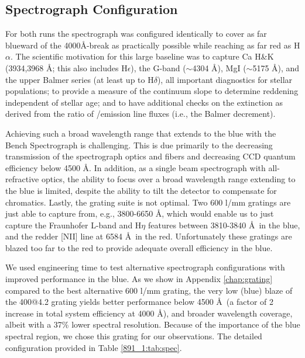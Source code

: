 \subsection{Spectrograph Configuration}

For both runs the spectrograph was configured identically to cover as
far blueward of the 4000\AA-break as practically possible while
reaching as far red as H$\alpha$.  The scientific motivation for this
large baseline was to capture Ca H\&K (3934,3968 \AA; this also
includes H$\epsilon$), the G-band ($\sim$4304 \AA), MgI
($\sim$5175 \AA), and the upper Balmer series (at least up to
H$\delta$), all important diagnostics for stellar populations; to
provide a measure of the continuum slope to determine reddening
independent of stellar age; and to have additional checks on the
extinction as derived from the ratio of \Ha/\HB emission line fluxes
(i.e., the Balmer decrement).

Achieving such a broad wavelength range that extends to the blue with
the Bench Spectrograph is challenging. This is due primarily to the
decreasing transmission of the spectrograph optics and fibers and
decreasing CCD quantum efficiency below 4500 \AA. In addition, as a
single beam spectrograph with all-refractive optics, the ability to
focus over a broad wavelength range extending to the blue is limited,
despite the ability to tilt the detector to compensate for chromatics.
Lastly, the grating suite is not optimal. Two 600 l/mm gratings are
just able to capture from, e.g., 3800-6650 \AA, which would enable us
to just capture the Fraunhofer L-band and H$\eta$ features between
3810-3840 \AA\ in the blue, and the redder [NII] line at 6584 \AA\ in the
red. Unfortunately these gratings are blazed too far to the red to
provide adequate overall efficiency in the blue.

We used engineering time to test alternative spectrograph
configurations with improved performance in the blue.  As we show in
Appendix \ref{chap:grating} compared to the best alternative 600 l/mm
grating, the very low (blue) blaze of the 400@4.2 grating yields
better performance below 4500 \AA\ (a factor of 2 increase in total
system efficiency at 4000 \AA), and broader wavelength coverage, albeit
with a 37\% lower spectral resolution. Because of the importance of
the blue spectral region, we chose this grating for our
observations. The detailed configuration provided in Table
\ref{891_1:tab:spec}.

